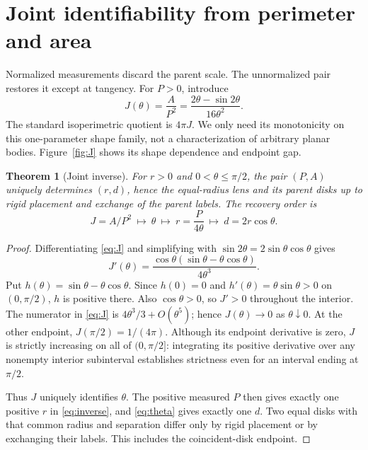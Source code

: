 \documentclass[11pt,a4paper]{article}
\newtheorem{theorem}{Theorem}[section]
\theoremstyle{definition}
\begin{document}
\section{Joint identifiability from perimeter and area}\label{sec:inverse}
Normalized measurements discard the parent scale. The unnormalized pair restores it except at tangency. For \(P>0\), introduce
\begin{equation}\label{eq:J}
 J(\theta)=\frac{A}{P^2}
 =\frac{2\theta-\sin2\theta}{16\theta^2}.
\end{equation}
The standard isoperimetric quotient is \(4\pi J\). We only need its monotonicity on this one-parameter shape family, not a characterization of arbitrary planar bodies. Figure~\ref{fig:J} shows its shape dependence and endpoint gap.

\begin{theorem}[Joint inverse]\label{thm:inverse}
For \(r>0\) and \(0<\theta\le\pi/2\), the pair \((P,A)\) uniquely determines \((r,d)\), hence the equal-radius lens and its parent disks up to rigid placement and exchange of the parent labels. The recovery order is
\begin{equation}\label{eq:inverse}
 J=A/P^2\ \longmapsto\ \theta\ \longmapsto\
 r=\frac{P}{4\theta}\ \longmapsto\ d=2r\cos\theta.
\end{equation}
\end{theorem}
\begin{proof}
Differentiating \eqref{eq:J} and simplifying with
\(\sin2\theta=2\sin\theta\cos\theta\) gives
\begin{equation}\label{eq:Jprime}
 J'(\theta)=
 \frac{\cos\theta(\sin\theta-\theta\cos\theta)}{4\theta^3}.
\end{equation}
Put \(h(\theta)=\sin\theta-\theta\cos\theta\). Since \(h(0)=0\) and
\(h'(\theta)=\theta\sin\theta>0\) on \((0,\pi/2)\), \(h\) is positive there. Also \(\cos\theta>0\), so \(J'>0\) throughout the interior. The numerator in \eqref{eq:J} is \(4\theta^3/3+O(\theta^5)\); hence \(J(\theta)\to0\) as \(\theta\downarrow0\). At the other endpoint, \(J(\pi/2)=1/(4\pi)\). Although its endpoint derivative is zero, \(J\) is strictly increasing on all of \((0,\pi/2]\): integrating its positive derivative over any nonempty interior subinterval establishes strictness even for an interval ending at \(\pi/2\).

Thus \(J\) uniquely identifies \(\theta\). The positive measured \(P\) then gives exactly one positive \(r\) in \eqref{eq:inverse}, and \eqref{eq:theta} gives exactly one \(d\). Two equal disks with that common radius and separation differ only by rigid placement or by exchanging their labels. This includes the coincident-disk endpoint.
\end{proof}
\end{document}
